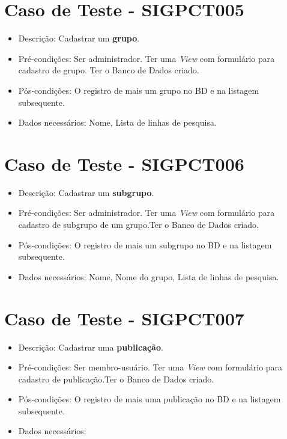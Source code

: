 \documentclass[11pt, a4paper]{book}
\begin{document}
	\section{Caso de Teste - SIGPCT005}
	\begin{itemize}
	\item Descrição: Cadastrar um \textbf{grupo}.
	\item Pré-condições: Ser administrador. Ter uma \emph{View} com formulário para cadastro de grupo. Ter o Banco de Dados criado.
	\item Pós-condições: O registro de mais um grupo no BD e na listagem subsequente.
	\item Dados necessários: Nome, Lista de linhas de pesquisa.
	\end{itemize}

	\section{Caso de Teste - SIGPCT006}
	\begin{itemize}
	\item Descrição: Cadastrar um \textbf{subgrupo}.
	\item Pré-condições: Ser administrador. Ter uma \emph{View} com formulário para cadastro de subgrupo de um grupo.Ter o Banco de Dados criado.
	\item Pós-condições: O registro de mais um subgrupo no BD e na listagem subsequente.
	\item Dados necessários: Nome, Nome do grupo, Lista de linhas de pesquisa.
	\end{itemize}

	\section{Caso de Teste - SIGPCT007}
	\begin{itemize}
	\item Descrição: Cadastrar uma \textbf{publicação}.
	\item Pré-condições: Ser membro-usuário. Ter uma \emph{View} com formulário para cadastro de publicação.Ter o Banco de Dados criado.
	\item Pós-condições: O registro de mais uma publicação no BD e na listagem subsequente.
	\item Dados necessários: 
	\end{itemize}
\end{document}
